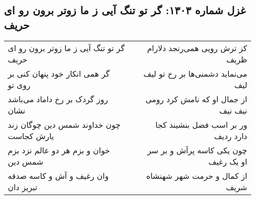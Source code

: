 \begin{center}
\section*{غزل شماره ۱۳۰۳: گر تو تنگ آیی ز ما زوتر برون رو ای حریف}
\label{sec:1303}
\begin{longtable}{l p{0.5cm} r}
گر تو تنگ آیی ز ما زوتر برون رو ای حریف
&&
کز ترش رویی همی‌رنجد دلارام ظریف
\\
گر همی انکار خود پنهان کنی بر روی تو
&&
می‌نماید دشمنی‌ها بر رخ تو لیف لیف
\\
روز گردک بر رخ داماد می‌باشد نشان
&&
از جمال او که نامش کرد رومی نیف نیف
\\
چون خداوند شمس دین چوگان زند یارش کجاست
&&
ور بر اسب فضل بنشیند کجا دارد ردیف
\\
خوان و بزم هر دو عالم نزد بزم شمس دین
&&
چون یکی کاسه پرآش و بر سر او یک رغیف
\\
وان رغیف و آش و کاسه صدقه تبریز دان
&&
از کمال و حرمت شهر شهنشاه شریف
\\
\end{longtable}
\end{center}
